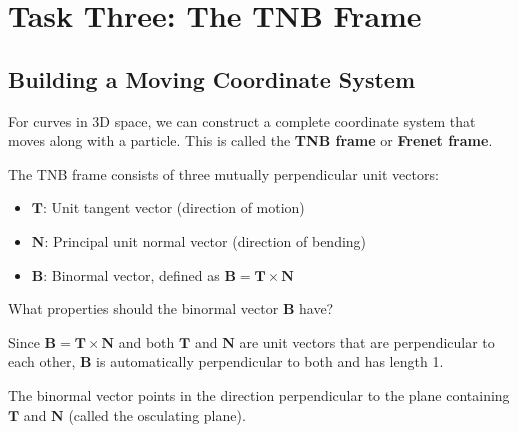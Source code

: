 \documentclass{ximera}
\begin{document}
\section*{Task Three: The TNB Frame}

\subsection*{Building a Moving Coordinate System}

For curves in 3D space, we can construct a complete coordinate system that moves along with a particle. This is called the \textbf{TNB frame} or \textbf{Frenet frame}.

\begin{definition}
The TNB frame consists of three mutually perpendicular unit vectors:
\begin{itemize}
    \item $\mathbf{T}$: Unit tangent vector (direction of motion)
    \item $\mathbf{N}$: Principal unit normal vector (direction of bending)
    \item $\mathbf{B}$: Binormal vector, defined as $\mathbf{B} = \mathbf{T} \times \mathbf{N}$
\end{itemize}
\end{definition}

\begin{problem}
What properties should the binormal vector $\mathbf{B}$ have?

\begin{selectAll}
\end{selectAll}

\begin{feedback}
Since $\mathbf{B} = \mathbf{T} \times \mathbf{N}$ and both $\mathbf{T}$ and $\mathbf{N}$ are unit vectors that are perpendicular to each other, $\mathbf{B}$ is automatically perpendicular to both and has length 1.

The binormal vector points in the direction perpendicular to the plane containing $\mathbf{T}$ and $\mathbf{N}$ (called the osculating plane).
\end{feedback}
\end{problem}
\end{document}
